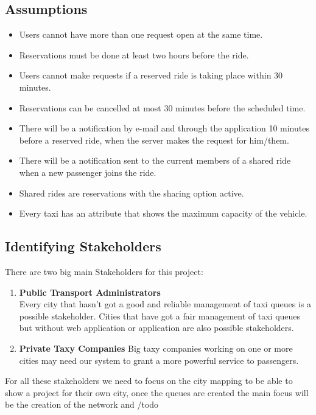\subsection{Assumptions}
\begin{itemize}
	\item Users cannot have more than one request open at the same time.
	\item Reservations must be done at least two hours before the ride.
	\item Users cannot make requests if a reserved ride is taking place within 30 minutes.
	\item Reservations can be cancelled at most 30 minutes before the scheduled time.
	\item There will be a notification by e-mail and through the application 10 minutes before a reserved ride, when the server makes the request for him/them.
	\item There will be a notification sent to  the current members of a shared ride when a new passenger joins the ride.
	\item Shared rides are reservations with the sharing option active.
	\item Every taxi has an attribute that shows the maximum capacity of the vehicle.
	
\end{itemize}

\subsection{Identifying Stakeholders}

There are two big main Stakeholders for this project:
\begin{enumerate}
	\item \textbf{Public Transport Administrators} \\
	Every city that hasn't got a good and reliable management of taxi queues is a possible stakeholder.  Cities that have got a fair management of taxi queues but without web application or application are also possible stakeholders.
	\item \textbf{Private Taxy Companies} 
	Big taxy companies working on one or more cities may need our system to grant a more powerful service to passengers.
\end{enumerate}
For all these stakeholders we need to focus on the city mapping to be able to show a project for their own city, once the queues are created the main focus will be the creation of the network and 
/todo 

